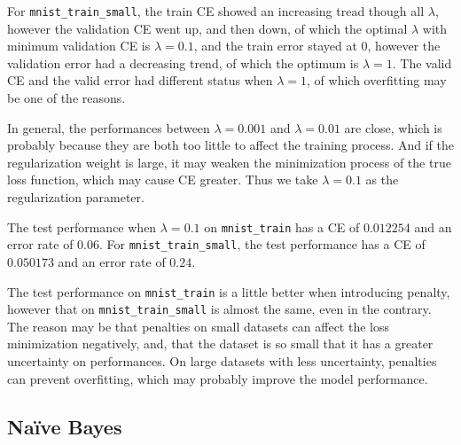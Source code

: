 \documentclass[10pt]{article}
\begin{document}
For \texttt{mnist\_train\_small}, the train CE showed an increasing tread though all $\lambda$, however the validation CE went up, and then down, of which the optimal $\lambda$ with minimum validation CE is $\lambda = 0.1$, and the train error stayed at $0$, however the validation error had a decreasing trend, of which the optimum is $\lambda = 1$. The valid CE and the valid error had different status when $\lambda = 1$, of which overfitting may be one of the reasons.\par
In general, the performances between $\lambda = 0.001$ and $\lambda = 0.01$ are close, which is probably because they are both too little to affect the training process. And if the regularization weight is large, it may weaken the minimization process of the true loss function, which may cause CE greater. Thus we take $\lambda = 0.1$ as the regularization parameter.\par
The test performance when $\lambda = 0.1$ on \texttt{mnist\_train} has a CE of $0.012254$ and an error rate of $0.06$. For \texttt{mnist\_train\_small}, the test performance has a CE of $0.050173$ and an error rate of $0.24$.\par
The test performance on \texttt{mnist\_train} is a little better when introducing penalty, however that on \texttt{mnist\_train\_small} is almost the same, even in the contrary. The reason may be that penalties on small datasets can affect the loss minimization negatively, and, that the dataset is so small that it has a greater uncertainty on performances. On large datasets with less uncertainty, penalties can prevent overfitting, which may probably improve the model performance.
\subsection{Naïve Bayes}
\end{document}
